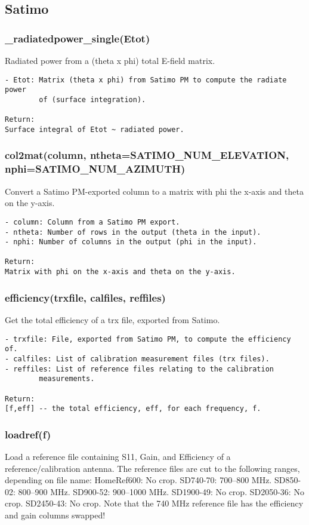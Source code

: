 \subsection{Satimo}
\subsubsection{\_radiatedpower\_single(Etot)}
Radiated power from a (theta x phi) total E-field matrix.

\begin{verbatim}
- Etot: Matrix (theta x phi) from Satimo PM to compute the radiate power
        of (surface integration).

Return:
Surface integral of Etot ~ radiated power.
\end{verbatim}

\subsubsection{col2mat(column, ntheta=SATIMO\_NUM\_ELEVATION, nphi=SATIMO\_NUM\_AZIMUTH)}
Convert a Satimo PM-exported column to a matrix with phi the 
x-axis and theta on the y-axis.

\begin{verbatim}
- column: Column from a Satimo PM export.
- ntheta: Number of rows in the output (theta in the input).
- nphi: Number of columns in the output (phi in the input).

Return:
Matrix with phi on the x-axis and theta on the y-axis.
\end{verbatim}

\subsubsection{efficiency(trxfile, calfiles, reffiles)}
Get the total efficiency of a trx file, exported from Satimo.

\begin{verbatim}
- trxfile: File, exported from Satimo PM, to compute the efficiency of.
- calfiles: List of calibration measurement files (trx files).
- reffiles: List of reference files relating to the calibration
        measurements.

Return:
[f,eff] -- the total efficiency, eff, for each frequency, f.
\end{verbatim}

\subsubsection{loadref(f)}
Load a reference file containing S11, Gain, and Efficiency of a
reference/calibration antenna.
The reference files are cut to the following ranges, depending on file name:
HomeRef600: No crop.
SD740-70: 700--800 MHz.
SD850-02: 800--900 MHz.
SD900-52: 900--1000 MHz.
SD1900-49: No crop.
SD2050-36: No crop.
SD2450-43: No crop.
Note that the 740 MHz reference file has the efficiency and gain columns
swapped!

